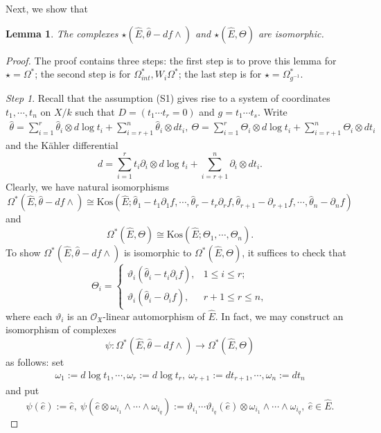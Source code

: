 \documentclass[12pt, a4paper]{article}
\newtheorem{lemma}{Lemma}[section]
\begin{document}
Next, we show that
\begin{lemma}
The complexes $\star(\hat E,\hat\theta-df\wedge)$ and $\star(\hat E,\Theta)$ are isomorphic.   
\end{lemma}
\begin{proof}
The proof contains three steps: the first step is to prove this lemma for $\star=\Omega^*$; the second step is for $\Omega^*_{int},W_i\Omega^*$; the last step is for $\star=\Omega^*_{g^{-1}}$.

\emph{Step 1}. Recall that the assumption (S1) gives rise to a system of coordinates $t_1,\cdots,t_n$ on $X/k$ such that $D=(t_1\cdots t_r=0)$ and $g=t_1\cdots t_s$. Write
\begin{eqnarray}\label{Theta cor}
\hat\theta=\sum_{i=1}^r\hat\theta_i\otimes d\log t_i+\sum_{i=r+1}^n\hat\theta_i\otimes dt_i,~\Theta=\sum_{i=1}^r\Theta_i\otimes d\log t_i+\sum_{i=r+1}^n\Theta_i\otimes dt_i
\end{eqnarray}
and the K\"ahler differential 
$$d=\sum_{i=1}^rt_i\partial_i\otimes d\log t_i+\sum_{i=r+1}^n\partial_i\otimes dt_i.$$ 
Clearly, we have natural isomorphisms
$$
\Omega^*(\hat E,\hat\theta-df\wedge)\cong\mathrm{Kos}(\hat E;\hat\theta_1-t_1\partial_1f,\cdots,\hat\theta_r-t_r\partial_rf,\hat\theta_{r+1}-\partial_{r+1}f,\cdots,\hat\theta_n-\partial_nf)
$$
and
$$
\Omega^*(\hat E,\Theta)\cong\mathrm{Kos}(\hat E;\Theta_1,\cdots,\Theta_n).
$$
To show $\Omega^*(\hat E,\hat\theta-df\wedge)$ is isomorphic to $\Omega^*(\hat E,\Theta)$, it suffices to check that 
$$
\Theta_i=\left\{
\begin{matrix}
  \vartheta_i(\hat\theta_i-t_i\partial_if),&1\leq i\leq r;\\
\vartheta_i(\hat\theta_i-\partial_if),&r+1\leq r\leq n,
\end{matrix}
\right.
$$
where each $\vartheta_i$ is an $\mathcal O_{\mathfrak X}$-linear automorphism of $\hat E$. In fact, we may construct an isomorphism of complexes 
$$
\psi:\Omega^*(\hat E,\hat\theta-df\wedge)\to\Omega^*(\hat E,\Theta) 
$$
as follows: set 
\begin{eqnarray}\label{omega}
\omega_1:=d\log t_1,\cdots,\omega_r:=d\log t_r,~\omega_{r+1}:=dt_{r+1},\cdots,\omega_n:=dt_n
\end{eqnarray}
and put
$$
\psi(\hat e):=\hat e,~\psi(\hat e\otimes\omega_{i_1}\wedge\cdots\wedge\omega_{i_q}):=\vartheta_{i_1}\cdots\vartheta_{i_q}(\hat e)\otimes\omega_{i_1}\wedge\cdots\wedge\omega_{i_q},~\hat e\in\hat E.
$$


\end{proof}
\end{document}
